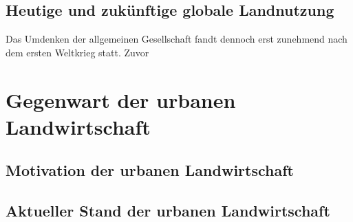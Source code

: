 \documentclass{scrartcl}
\begin{document}
\subsection{Heutige und zukünftige globale Landnutzung}


Das Umdenken der allgemeinen Gesellschaft fandt dennoch erst zunehmend nach dem ersten Weltkrieg statt. Zuvor 



\section{Gegenwart der urbanen Landwirtschaft}
\subsection{Motivation der urbanen Landwirtschaft}

\subsection{Aktueller Stand der urbanen Landwirtschaft}
\end{document}
